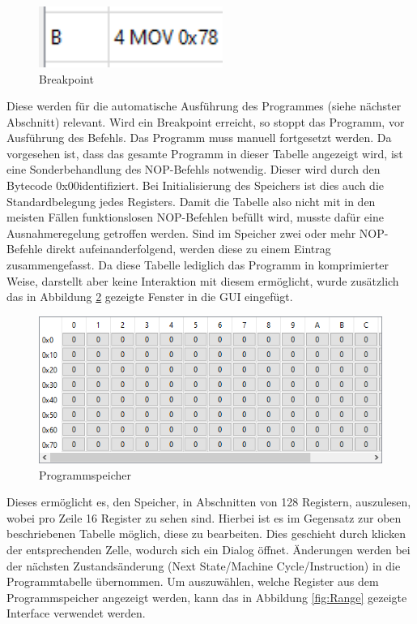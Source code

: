 \documentclass[12pt]{article}
\newcommand{\imgSpaceBefore}{\vspace{10pt}}
\begin{document}
\begin{figure}[h]
\centering
\includegraphics[width=6cm]{bilder/Breakpoint}
\caption{Breakpoint}
\label{fig:Break}
\end{figure}

\noindent
Diese werden für die automatische Ausführung des Programmes (siehe nächster Abschnitt) relevant. Wird ein Breakpoint erreicht, so stoppt das Programm, vor Ausführung des Befehls. Das Programm muss manuell fortgesetzt werden. Da vorgesehen ist, dass das gesamte Programm in dieser Tabelle angezeigt wird, ist eine Sonderbehandlung des NOP-Befehls notwendig. Dieser wird durch den Bytecode \glqq 0x00\grqq identifiziert. Bei Initialisierung des Speichers ist dies auch die Standardbelegung jedes Registers. Damit die Tabelle also nicht mit in den meisten Fällen funktionslosen NOP-Befehlen befüllt wird, musste dafür eine Ausnahmeregelung getroffen werden. Sind im Speicher zwei oder mehr NOP-Befehle direkt aufeinanderfolgend, werden diese zu einem Eintrag zusammengefasst. Da diese Tabelle lediglich das Programm in komprimierter Weise, darstellt aber keine Interaktion mit diesem ermöglicht, wurde zusätzlich das in Abbildung \ref{fig:ProgSpeicher} gezeigte Fenster in die GUI eingefügt.\imgSpaceBefore

\begin{figure}[H]
\centering
\includegraphics[width=12cm]{bilder/ProgramMemory}
\caption{Programmspeicher}
\label{fig:ProgSpeicher}
\end{figure}

\noindent
Dieses ermöglicht es, den Speicher, in Abschnitten von 128 Registern, auszulesen, wobei pro Zeile 16 Register zu sehen sind. Hierbei ist es im Gegensatz zur oben beschriebenen Tabelle möglich, diese zu bearbeiten. Dies geschieht durch klicken der entsprechenden Zelle, wodurch sich ein Dialog öffnet. Änderungen werden bei der nächsten Zustandsänderung (\glqq Next State/Machine Cycle/Instruction\grqq) in die Programmtabelle übernommen. Um auszuwählen, welche Register aus dem Programmspeicher angezeigt werden, kann das in Abbildung \ref{fig:Range} gezeigte Interface verwendet werden.\imgSpaceBefore
\end{document}
